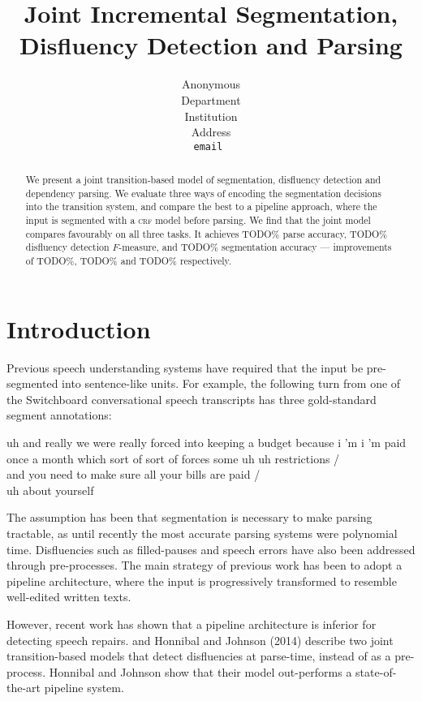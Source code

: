 \documentclass[11pt,letterpaper]{article}
\title{Joint Incremental Segmentation, Disfluency Detection and Parsing}
\author{
	Anonymous\\
  	Department\\
  	Institution\\
  	Address\\
  {\tt \small email }\\
}
\date{}
\begin{document}
\maketitle
\begin{abstract}
We present a joint transition-based model of segmentation, disfluency detection
and dependency parsing.  We evaluate three ways of encoding the segmentation
decisions into the transition system, and compare the best to a pipeline approach,
where the input is segmented with a \textsc{crf} model before parsing.
We find that the joint model compares favourably on all three tasks. It achieves
TODO\% parse accuracy, TODO\% disfluency detection $F$-measure, and TODO\%
segmentation accuracy --- improvements of TODO\%, TODO\% and TODO\% respectively.

\end{abstract}

\section{Introduction}

Previous speech understanding systems have required that the input be
pre-segmented into sentence-like units. 
For example, the following turn from one of the Switchboard conversational speech
transcripts has three gold-standard segment annotations:

\begin{lexample}
\small
uh and really we were really forced into keeping a budget because i 'm i 'm paid once a month which sort of sort of forces some uh uh restrictions / \\
and you need to make sure all your bills are paid / \\
uh about yourself
\end{lexample}

\noindent 
The assumption has been that segmentation
is necessary to make parsing tractable, as until recently the most accurate parsing
systems were polynomial time.  Disfluencies such as filled-pauses and speech
errors have also been addressed through pre-processes.
The main strategy of previous work has been to adopt a pipeline
architecture, where the input is progressively transformed to resemble well-edited
written texts.

However, recent work has shown that a pipeline architecture is inferior for detecting
speech repairs.  \citet{rasooli:13} and Honnibal and Johnson (2014)
describe two joint
transition-based models that detect disfluencies at parse-time, instead of as a
pre-process.  Honnibal and Johnson show that their model out-performs a state-of-the-art
pipeline system.
\end{document}
